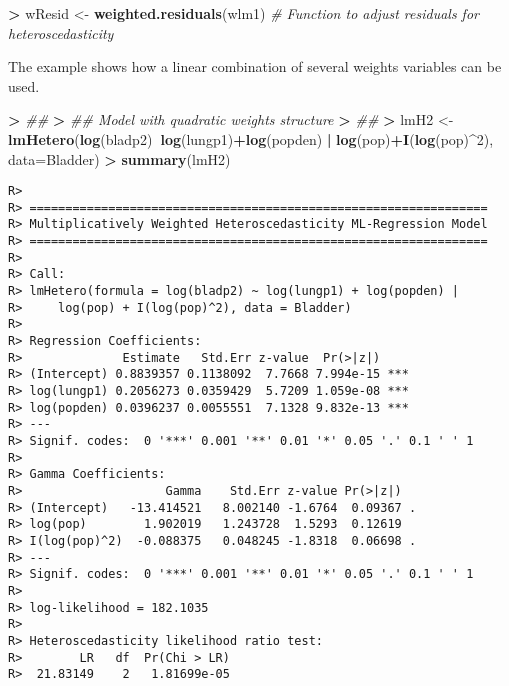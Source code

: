 \documentclass[
]{article}
\newenvironment{Shaded}{\begin{snugshade}}{\end{snugshade}}
\newcommand{\CommentTok}[1]{\textcolor[rgb]{0.56,0.35,0.01}{\textit{#1}}}
\newcommand{\DataTypeTok}[1]{\textcolor[rgb]{0.13,0.29,0.53}{#1}}
\newcommand{\DecValTok}[1]{\textcolor[rgb]{0.00,0.00,0.81}{#1}}
\newcommand{\ErrorTok}[1]{\textcolor[rgb]{0.64,0.00,0.00}{\textbf{#1}}}
\newcommand{\KeywordTok}[1]{\textcolor[rgb]{0.13,0.29,0.53}{\textbf{#1}}}
\newcommand{\NormalTok}[1]{#1}
\newcommand{\OperatorTok}[1]{\textcolor[rgb]{0.81,0.36,0.00}{\textbf{#1}}}
\newcommand{\StringTok}[1]{\textcolor[rgb]{0.31,0.60,0.02}{#1}}
\begin{document}
\begin{Shaded}
\begin{Highlighting}[]
\OperatorTok{>}\StringTok{ }\NormalTok{wResid <-}\StringTok{ }\KeywordTok{weighted.residuals}\NormalTok{(wlm1)    }\CommentTok{# Function to adjust residuals for heteroscedasticity}
\end{Highlighting}
\end{Shaded}

The example shows how a linear combination of several weights variables
can be used.

\begin{Shaded}
\begin{Highlighting}[]
\OperatorTok{>}\StringTok{ }\CommentTok{##}
\ErrorTok{>}\StringTok{ }\CommentTok{## Model with quadratic weights structure}
\ErrorTok{>}\StringTok{ }\CommentTok{##}
\ErrorTok{>}\StringTok{ }\NormalTok{lmH2 <-}\StringTok{ }\KeywordTok{lmHetero}\NormalTok{(}\KeywordTok{log}\NormalTok{(bladp2)}\OperatorTok{~}\KeywordTok{log}\NormalTok{(lungp1)}\OperatorTok{+}\KeywordTok{log}\NormalTok{(popden) }\OperatorTok{|}\StringTok{ }\KeywordTok{log}\NormalTok{(pop)}\OperatorTok{+}\KeywordTok{I}\NormalTok{(}\KeywordTok{log}\NormalTok{(pop)}\OperatorTok{^}\DecValTok{2}\NormalTok{), }\DataTypeTok{data=}\NormalTok{Bladder)}
\OperatorTok{>}\StringTok{ }\KeywordTok{summary}\NormalTok{(lmH2)}
\end{Highlighting}
\end{Shaded}

\begin{verbatim}
R> 
R> ================================================================
R> Multiplicatively Weighted Heteroscedasticity ML-Regression Model
R> ================================================================
R> 
R> Call:
R> lmHetero(formula = log(bladp2) ~ log(lungp1) + log(popden) | 
R>     log(pop) + I(log(pop)^2), data = Bladder)
R> 
R> Regression Coefficients:
R>              Estimate   Std.Err z-value  Pr(>|z|)    
R> (Intercept) 0.8839357 0.1138092  7.7668 7.994e-15 ***
R> log(lungp1) 0.2056273 0.0359429  5.7209 1.059e-08 ***
R> log(popden) 0.0396237 0.0055551  7.1328 9.832e-13 ***
R> ---
R> Signif. codes:  0 '***' 0.001 '**' 0.01 '*' 0.05 '.' 0.1 ' ' 1
R> 
R> Gamma Coefficients:
R>                    Gamma    Std.Err z-value Pr(>|z|)  
R> (Intercept)   -13.414521   8.002140 -1.6764  0.09367 .
R> log(pop)        1.902019   1.243728  1.5293  0.12619  
R> I(log(pop)^2)  -0.088375   0.048245 -1.8318  0.06698 .
R> ---
R> Signif. codes:  0 '***' 0.001 '**' 0.01 '*' 0.05 '.' 0.1 ' ' 1
R> 
R> log-likelihood = 182.1035 
R> 
R> Heteroscedasticity likelihood ratio test:
R>        LR   df  Pr(Chi > LR)
R>  21.83149    2   1.81699e-05
\end{verbatim}
\end{document}
